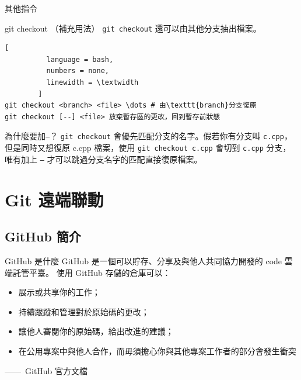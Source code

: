 \documentclass[xetex, unicode, 10pt, aspectratio=169]{beamer}
\begin{document}
\begin{frame}[fragile]{其他指令}
    \begin{block}{git checkout （補充用法）}
        \texttt{git checkout} 還可以由其他分支抽出檔案。
        \begin{lstlisting}[
          language = bash,
          numbers = none,
          linewidth = \textwidth
        ]
git checkout <branch> <file> \dots # 由\texttt{branch}分支復原
git checkout [--] <file> 放棄暫存區的更改，回到暫存前狀態\end{lstlisting}
        \begin{block}{為什麼要加\texttt{--}？}
            \justify\hspace{18pt}\texttt{git checkout} 會優先匹配分支的名字。假若你有分支叫 \texttt{c.cpp}，但是同時又想復原 c.cpp 檔案，使用 \texttt{git checkout c.cpp} 會切到 \texttt{c.cpp} 分支，唯有加上 \texttt{--} 才可以跳過分支名字的匹配直接復原檔案。
        \end{block}
    \end{block}
\end{frame}

\section{Git 遠端聯動}

\subsection{GitHub 簡介}

\begin{frame}{GitHub 是什麼}
    GitHub 是一個可以貯存、分享及與他人共同協力開發的 code 雲端託管平臺。
    使用 GitHub 存儲的倉庫可以：
    \begin{itemize}
        \item 展示或共享你的工作；
        \item 持續跟蹤和管理對於原始碼的更改；
        \item 讓他人審閱你的原始碼，給出改進的建議；
        \item 在公用專案中與他人合作，而毋須擔心你與其他專案工作者的部分會發生衝突
    \end{itemize}

    \hfill ——\ GitHub 官方文檔
\end{frame}
\end{document}

